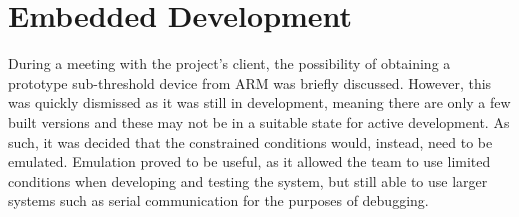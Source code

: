 \chapter{Embedded Development}\label{chap:embedded}

During a meeting with the project's client, the possibility of obtaining a prototype sub-threshold device from ARM was briefly discussed. However, this was quickly dismissed as it was still in development, meaning there are only a few built versions and these may not be in a suitable state for active development. As such, it was decided that the constrained conditions would, instead, need to be emulated. Emulation proved to be useful, as it allowed the team to use limited conditions when developing and testing the system, but still able to use larger systems such as serial communication for the purposes of debugging.






